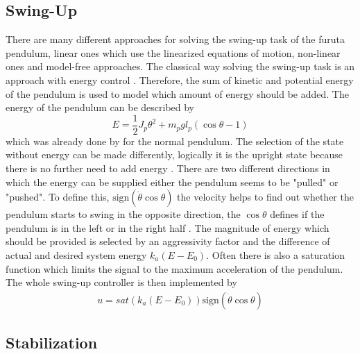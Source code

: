 \subsection{Swing-Up}
There are many different approaches for solving the swing-up task of the furuta 
pendulum, linear ones which use the linearized equations of motion, non-linear 
ones and model-free approaches. The classical way solving the swing-up task is 
an approach with energy control \cite{seman2013swinging}. Therefore, the sum of 
kinetic and potential energy of the pendulum is used to model which amount of 
energy should be added. The energy of the pendulum can be described by 
\[E = \frac{1}{2}J_p\theta^2+m_pgl_p(\cos \theta -1)\] which was already done 
by \citeauthor{aastrom2000swinging} for the normal pendulum.
The selection of the state without energy can be made differently, logically it 
is the upright state because there is no further need to add energy 
\cite{seman2013swinging}. There are two different directions in which the 
energy can be supplied either the pendulum seems to be "pulled" or "pushed". To 
define this, $\text{sign}(\dot{\theta}\cos\theta)$ the velocity helps to find 
out whether the pendulum starts to swing in the opposite direction, the $\cos 
\theta$ defines if the pendulum is in the left or in the right half 
\cite{awtar2002inverted}. The magnitude of energy which should be provided is 
selected by an aggressivity factor and the difference of actual and desired 
system energy $k_a(E-E_0)$. Often there is also a saturation function which 
limits the signal to the maximum acceleration of the pendulum. The whole 
swing-up controller is then implemented by 
\begin{align*}
u = sat(k_a(E-E_0))\text{sign}(\dot{\theta}\cos\theta)
\end{align*}
\subsection{Stabilization}

